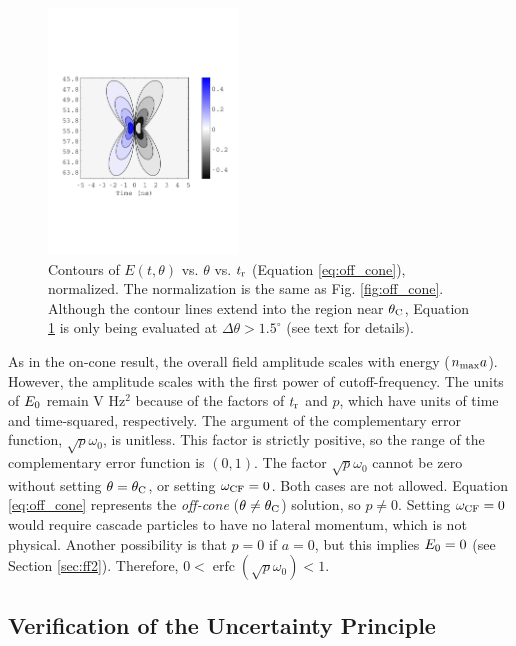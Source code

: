 \documentclass[amsmath,amssymb,aps,prd,10pt,twocolumn]{revtex4}
\DeclareMathOperator\erfc{erfc}
\begin{document}
\begin{figure}
\centering
\includegraphics[width=0.45\textwidth,trim=0cm 6cm 0cm 6cm,clip=true]{May5_plot3.pdf}
\caption{\label{fig:off_cone2} Contours of $E(t,\theta)$ vs. $\theta$ vs. $t_{\rm r}$ (Equation \ref{eq:off_cone}), normalized.  The normalization is the same as Fig. \ref{fig:off_cone}.  Although the contour lines extend into the region near $\theta_{\rm C}$, Equation \ref{fig:off_cone2} is only being evaluated at $\Delta \theta > 1.5^{\circ}$ (see text for details).}
\end{figure}

As in the on-cone result, the overall field amplitude scales with energy ($n_{\rm max} a$).  However, the amplitude scales with the first power of cutoff-frequency.  The units of $E_{\rm 0}$ remain V Hz$^2$ because of the factors of $t_{\rm r}$ and $p$, which have units of time and time-squared, respectively.  The argument of the complementary error function, $\sqrt{p}\omega_0$, is unitless.  This factor is strictly positive, so the range of the complementary error function is $(0,1)$.  The factor $\sqrt{p}\omega_0$ cannot be zero without setting $\theta = \theta_{\rm C}$, or setting $\omega_{\rm CF} = 0$.  Both cases are not allowed.  Equation \ref{eq:off_cone} represents the \textit{off-cone} ($\theta \neq \theta_{\rm C}$) solution, so $p \neq 0$.  Setting $\omega_{\rm CF} = 0$ would require cascade particles to have no lateral momentum, which is not physical.  Another possibility is that $p = 0$ if $a = 0$, but this implies $E_{\rm 0}=0$ (see Section \ref{sec:ff2}).  Therefore, $0 < \erfc(\sqrt{p}\omega_0) < 1$.

\subsection{Verification of the Uncertainty Principle}
\label{sec:sigma}
\end{document}
